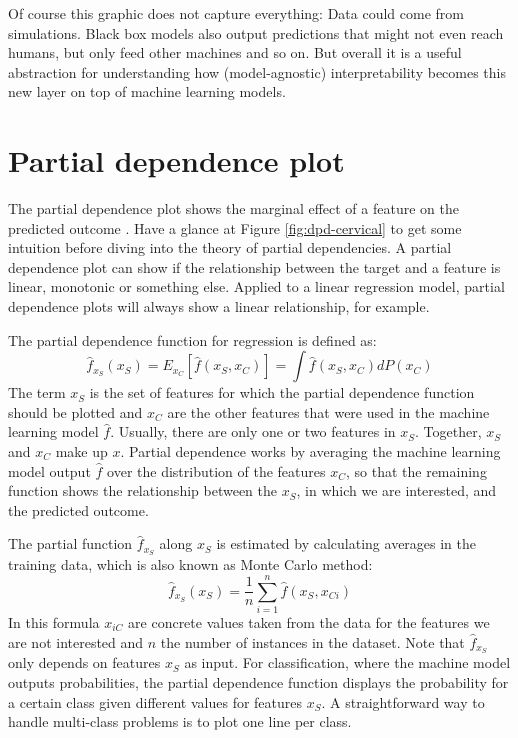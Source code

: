 \documentclass[12pt,]{krantz}
\theoremstyle{definition}
\theoremstyle{definition}
\theoremstyle{definition}
\theoremstyle{remark}
\begin{document}
Of course this graphic does not capture everything: Data could come from
simulations. Black box models also output predictions that might not
even reach humans, but only feed other machines and so on. But overall
it is a useful abstraction for understanding how (model-agnostic)
interpretability becomes this new layer on top of machine learning
models.

\section{Partial dependence plot}\label{pdp}

The partial dependence plot shows the marginal effect of a feature on
the predicted outcome \citep{friedman2001greedy}. Have a glance at
Figure \ref{fig:dpd-cervical} to get some intuition before diving into
the theory of partial dependencies. A partial dependence plot can show
if the relationship between the target and a feature is linear,
monotonic or something else. Applied to a linear regression model,
partial dependence plots will always show a linear relationship, for
example.

The partial dependence function for regression is defined as:
\[\hat{f}_{x_S}(x_S) = E_{x_C}\left[\hat{f}(x_S, x_C)\right] = \int \hat{f}(x_S, x_C) dP(x_C)\]
The term \(x_S\) is the set of features for which the partial dependence
function should be plotted and \(x_C\) are the other features that were
used in the machine learning model \(\hat{f}\). Usually, there are only
one or two features in \(x_S\). Together, \(x_S\) and \(x_C\) make up
\(x\). Partial dependence works by averaging the machine learning model
output \(\hat{f}\) over the distribution of the features \(x_C\), so
that the remaining function shows the relationship between the \(x_S\),
in which we are interested, and the predicted outcome.

The partial function \(\hat{f}_{x_S}\) along \(x_S\) is estimated by
calculating averages in the training data, which is also known as Monte
Carlo method:
\[ \hat{f}_{x_S}(x_S) = \frac{1}{n} \sum_{i=1}^n \hat{f}(x_S, x_{Ci}) \]
In this formula \(x_{iC}\) are concrete values taken from the data for
the features we are not interested and \(n\) the number of instances in
the dataset. Note that \(\hat{f}_{x_S}\) only depends on features
\(x_S\) as input. For classification, where the machine model outputs
probabilities, the partial dependence function displays the probability
for a certain class given different values for features \(x_S\). A
straightforward way to handle multi-class problems is to plot one line
per class.
\end{document}
